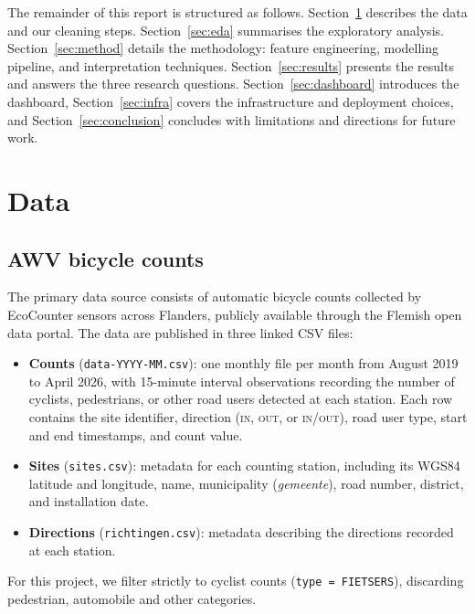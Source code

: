 \documentclass[11pt,a4paper]{article}
\begin{document}
The remainder of this report is structured as follows.
Section~\ref{sec:data} describes the data and our cleaning steps.
Section~\ref{sec:eda} summarises the exploratory analysis.
Section~\ref{sec:method} details the methodology: feature
engineering, modelling pipeline, and interpretation techniques.
Section~\ref{sec:results} presents the results and answers the three
research questions. Section~\ref{sec:dashboard} introduces the
dashboard, Section~\ref{sec:infra} covers the infrastructure and
deployment choices, and Section~\ref{sec:conclusion} concludes with
limitations and directions for future work.

\section{Data}
\label{sec:data}

\subsection{AWV bicycle counts}

The primary data source consists of automatic bicycle counts collected
by EcoCounter sensors across Flanders, publicly available through the
Flemish open data portal. The data are published in three linked CSV
files:

\begin{itemize}[leftmargin=*]
  \item \textbf{Counts} (\texttt{data-YYYY-MM.csv}): one monthly file
  per month from August 2019 to April 2026, with 15-minute interval
  observations recording the number of cyclists, pedestrians, or other
  road users detected at each station. Each row contains the site
  identifier, direction (\textsc{in}, \textsc{out}, or
  \textsc{in/out}), road user type, start and end timestamps, and count
  value.
  \item \textbf{Sites} (\texttt{sites.csv}): metadata for each counting
  station, including its WGS84 latitude and longitude, name,
  municipality (\textit{gemeente}), road number, district, and
  installation date.
  \item \textbf{Directions} (\texttt{richtingen.csv}): metadata
  describing the directions recorded at each station.
\end{itemize}

For this project, we filter strictly to cyclist counts
(\texttt{type = FIETSERS}), discarding pedestrian, automobile and other
categories.
\end{document}
